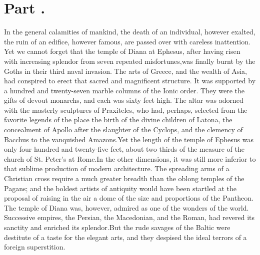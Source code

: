 \section{Part \thesection.}
\thispagestyle{simple}

In the general calamities of mankind, the death of an individual,
however exalted, the ruin of an edifice, however famous, are
passed over with careless inattention. Yet we cannot forget that
the temple of Diana at Ephesus, after having risen with
increasing splendor from seven repeated misfortunes,\footnotemark[128] was
finally burnt by the Goths in their third naval invasion. The
arts of Greece, and the wealth of Asia, had conspired to erect
that sacred and magnificent structure. It was supported by a
hundred and twenty-seven marble columns of the Ionic order. They
were the gifts of devout monarchs, and each was sixty feet high.
The altar was adorned with the masterly sculptures of Praxiteles,
who had, perhaps, selected from the favorite legends of the place
the birth of the divine children of Latona, the concealment of
Apollo after the slaughter of the Cyclops, and the clemency of
Bacchus to the vanquished Amazons.\footnotemark[129] Yet the length of the
temple of Ephesus was only four hundred and twenty-five feet,
about two thirds of the measure of the church of St. Peter’s at
Rome.\footnotemark[130] In the other dimensions, it was still more inferior to
that sublime production of modern architecture. The spreading
arms of a Christian cross require a much greater breadth than the
oblong temples of the Pagans; and the boldest artists of
antiquity would have been startled at the proposal of raising in
the air a dome of the size and proportions of the Pantheon. The
temple of Diana was, however, admired as one of the wonders of
the world. Successive empires, the Persian, the Macedonian, and
the Roman, had revered its sanctity and enriched its splendor.\footnotemark[131]
But the rude savages of the Baltic were destitute of a taste
for the elegant arts, and they despised the ideal terrors of a
foreign superstition.\footnotemark[132]




